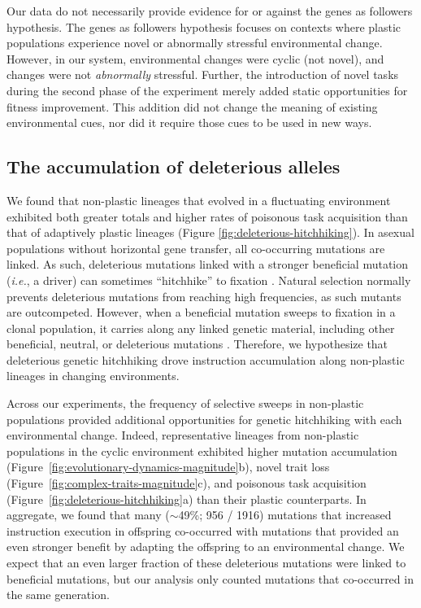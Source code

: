 Our data do not necessarily provide evidence for or against the genes as followers hypothesis.
The genes as followers hypothesis focuses on contexts where plastic populations experience novel or abnormally stressful environmental change.
However, in our system, environmental changes were cyclic (not novel), and changes were not \textit{abnormally} stressful.
Further, the introduction of novel tasks during the second phase of the experiment merely added static opportunities for fitness improvement.
This addition did not change the meaning of existing environmental cues, nor did it require those cues to be used in new ways. 
 

\subsection{The accumulation of deleterious alleles}

We found that non-plastic lineages that evolved in a fluctuating environment exhibited both greater totals and higher rates of poisonous task acquisition than that of adaptively plastic lineages (Figure \ref{fig:deleterious-hitchhiking}).
In asexual populations without horizontal gene transfer, all co-occurring mutations are linked.
As such, deleterious mutations linked with a stronger beneficial mutation (\textit{i.e.}, a driver) can sometimes ``hitchhike'' to fixation \citep{smith_hitch-hiking_1974,van_den_bergh_experimental_2018,buskirk_hitchhiking_2017}.
Natural selection normally prevents deleterious mutations from reaching high frequencies, as such mutants are outcompeted.
However, when a beneficial mutation sweeps to fixation in a clonal population, it carries along any linked genetic material, including other beneficial, neutral, or deleterious mutations \citep{barton_genetic_2000, smith_hitch-hiking_1974}.
Therefore, we hypothesize that deleterious genetic hitchhiking drove  instruction accumulation along non-plastic lineages in changing environments.

Across our experiments, the frequency of selective sweeps in non-plastic populations provided additional opportunities for genetic hitchhiking with each environmental change. 
Indeed, representative lineages from non-plastic populations in the cyclic environment exhibited higher mutation accumulation (Figure~\ref{fig:evolutionary-dynamics-magnitude}b), novel trait loss (Figure~\ref{fig:complex-traits-magnitude}c), and poisonous task acquisition (Figure~\ref{fig:deleterious-hitchhiking}a) than their plastic counterparts.
In aggregate, we found that many ($\sim$49\%; 956 / 1916) mutations that increased  instruction execution in offspring co-occurred with mutations that provided an even stronger benefit by adapting the offspring to an environmental change.
We expect that an even larger fraction of these deleterious mutations were linked to beneficial mutations, but our analysis only counted mutations that co-occurred in the same generation.


